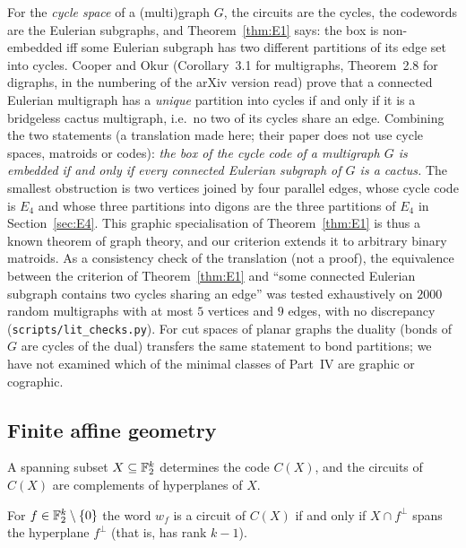 \begin{remark}\label{rem:cooperokur}
For the \emph{cycle space} of a (multi)graph $G$, the circuits are the cycles, the codewords are the Eulerian subgraphs, and Theorem~\ref{thm:E1} says: the box is non-embedded iff some Eulerian subgraph has two different partitions of its edge set into cycles. Cooper and Okur \cite{CooperOkur} (Corollary~3.1 for multigraphs, Theorem~2.8 for digraphs, in the numbering of the arXiv version read) prove that a connected Eulerian multigraph has a \emph{unique} partition into cycles if and only if it is a bridgeless cactus multigraph, i.e.\ no two of its cycles share an edge. Combining the two statements (a translation made here; their paper does not use cycle spaces, matroids or codes): \emph{the box of the cycle code of a multigraph $G$ is embedded if and only if every connected Eulerian subgraph of $G$ is a cactus.} The smallest obstruction is two vertices joined by four parallel edges, whose cycle code is $E_4$ and whose three partitions into digons are the three partitions of $E_4$ in Section~\ref{sec:E4}. This graphic specialisation of Theorem~\ref{thm:E1} is thus a known theorem of graph theory, and our criterion extends it to arbitrary binary matroids. As a consistency check of the translation (not a proof), the equivalence between the criterion of Theorem~\ref{thm:E1} and ``some connected Eulerian subgraph contains two cycles sharing an edge'' was tested exhaustively on $2000$ random multigraphs with at most $5$ vertices and $9$ edges, with no discrepancy (\texttt{scripts/lit\_checks.py}). For cut spaces of planar graphs the duality (bonds of $G$ are cycles of the dual) transfers the same statement to bond partitions; we have not examined which of the minimal classes of Part~IV are graphic or cographic.
\end{remark}

\subsection{Finite affine geometry}

A spanning subset $X\subseteq\mathbb F_2^k$ determines the code $C(X)$, and the circuits of $C(X)$ are complements of hyperplanes of $X$.

\begin{lemma}\label{lem:hyp}
For $f\in\mathbb F_2^k\setminus\{0\}$ the word $w_f$ is a circuit of $C(X)$ if and only if $X\cap f^\perp$ spans the hyperplane $f^\perp$ (that is, has rank $k-1$).
\end{lemma}

